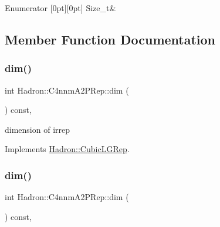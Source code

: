 \begin{DoxyEnumFields}{Enumerator}
[0pt][0pt]{}\mbox{\label{structHadron_1_1C4nnmA2PRep_a64468fe826a0dabe3f97397181e63bacabedf1af48805333d8d950eeb2d123464}} 
Size\+\_\+t&\\
\hline

\end{DoxyEnumFields}


\subsection{Member Function Documentation}
\mbox{\label{structHadron_1_1C4nnmA2PRep_a3865ab495cd2e1f4ebd33dae51d96017}} 
\subsubsection{\texorpdfstring{dim()}{dim()}\hspace{0.1cm}{\footnotesize\ttfamily [1/3]}}
{\footnotesize\ttfamily int Hadron\+::\+C4nnm\+A2\+P\+Rep\+::dim (\begin{DoxyParamCaption}{ }\end{DoxyParamCaption}) const\hspace{0.3cm}{\ttfamily [inline]}, {\ttfamily [virtual]}}

dimension of irrep 

Implements \mbox{\hyperlink{structHadron_1_1CubicLGRep_a3acbaea26503ed64f20df693a48e4cdd}{Hadron\+::\+Cubic\+L\+G\+Rep}}.

\mbox{\label{structHadron_1_1C4nnmA2PRep_a3865ab495cd2e1f4ebd33dae51d96017}} 
\subsubsection{\texorpdfstring{dim()}{dim()}\hspace{0.1cm}{\footnotesize\ttfamily [2/3]}}
{\footnotesize\ttfamily int Hadron\+::\+C4nnm\+A2\+P\+Rep\+::dim (\begin{DoxyParamCaption}{ }\end{DoxyParamCaption}) const\hspace{0.3cm}{\ttfamily [inline]}, {\ttfamily [virtual]}}


